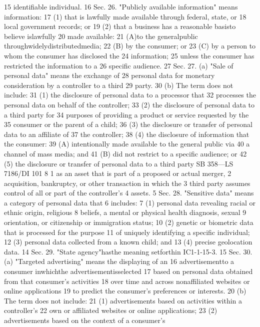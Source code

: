15 identifiable individual.
16 Sec. 26. "Publicly available information" means information:
17 (1) that is lawfully made available through federal, state, or
18 local government records; or
19 (2) that a business has a reasonable basisto believe islawfully
20 made available:
21 (A)to the generalpublic throughwidelydistributedmedia;
22 (B) by the consumer; or
23 (C) by a person to whom the consumer has disclosed the
24 information;
25 unless the consumer has restricted the information to a
26 specific audience.
27 Sec. 27. (a) "Sale of personal data" means the exchange of
28 personal data for monetary consideration by a controller to a third
29 party.
30 (b) The term does not include:
31 (1) the disclosure of personal data to a processor that
32 processes the personal data on behalf of the controller;
33 (2) the disclosure of personal data to a third party for
34 purposes of providing a product or service requested by the
35 consumer or the parent of a child;
36 (3) the disclosure or transfer of personal data to an affiliate of
37 the controller;
38 (4) the disclosure of information that the consumer:
39 (A) intentionally made available to the general public via
40 a channel of mass media; and
41 (B) did not restrict to a specific audience; or
42 (5) the disclosure or transfer of personal data to a third party
SB 358—LS 7186/DI 101
8
1 as an asset that is part of a proposed or actual merger,
2 acquisition, bankruptcy, or other transaction in which the
3 third party assumes control of all or part of the controller's
4 assets.
5 Sec. 28. "Sensitive data" means a category of personal data that
6 includes:
7 (1) personal data revealing racial or ethnic origin, religious
8 beliefs, a mental or physical health diagnosis, sexual
9 orientation, or citizenship or immigration status;
10 (2) genetic or biometric data that is processed for the purpose
11 of uniquely identifying a specific individual;
12 (3) personal data collected from a known child; and
13 (4) precise geolocation data.
14 Sec. 29. "State agency"hasthe meaning setforthin IC1-1-15-3.
15 Sec. 30. (a) "Targeted advertising" means the displaying of an
16 advertisementto a consumer inwhichthe advertisementisselected
17 based on personal data obtained from that consumer's activities
18 over time and across nonaffiliated websites or online applications
19 to predict the consumer's preferences or interests.
20 (b) The term does not include:
21 (1) advertisements based on activities within a controller's
22 own or affiliated websites or online applications;
23 (2) advertisements based on the context of a consumer's
